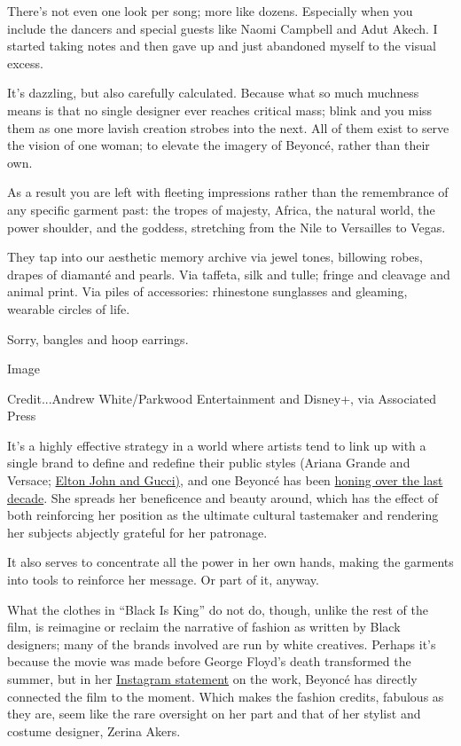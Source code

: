There's not even one look per song; more like dozens. Especially when
you include the dancers and special guests like Naomi Campbell and Adut
Akech. I started taking notes and then gave up and just abandoned myself
to the visual excess.

It's dazzling, but also carefully calculated. Because what so much
muchness means is that no single designer ever reaches critical mass;
blink and you miss them as one more lavish creation strobes into the
next. All of them exist to serve the vision of one woman; to elevate the
imagery of Beyoncé, rather than their own.

As a result you are left with fleeting impressions rather than the
remembrance of any specific garment past: the tropes of majesty, Africa,
the natural world, the power shoulder, and the goddess, stretching from
the Nile to Versailles to Vegas.

They tap into our aesthetic memory archive via jewel tones, billowing
robes, drapes of diamanté and pearls. Via taffeta, silk and tulle;
fringe and cleavage and animal print. Via piles of accessories:
rhinestone sunglasses and gleaming, wearable circles of life.

Sorry, bangles and hoop earrings.

Image

Credit...Andrew White/Parkwood Entertainment and Disney+, via Associated
Press

It's a highly effective strategy in a world where artists tend to link
up with a single brand to define and redefine their public styles
(Ariana Grande and Versace;
\href{https://www.nytimes3xbfgragh.onion/2018/09/07/style/elton-john-farewell-tour-wardrobe-gucci.html}{Elton
John and Gucci)}, and one Beyoncé has been
\href{https://www.nytimes3xbfgragh.onion/2016/04/26/fashion/fashion-beyonce-lemonade.html}{honing
over the last decade}. She spreads her beneficence and beauty around,
which has the effect of both reinforcing her position as the ultimate
cultural tastemaker and rendering her subjects abjectly grateful for her
patronage.

It also serves to concentrate all the power in her own hands, making the
garments into tools to reinforce her message. Or part of it, anyway.

What the clothes in ``Black Is King'' do not do, though, unlike the rest
of the film, is reimagine or reclaim the narrative of fashion as written
by Black designers; many of the brands involved are run by white
creatives. Perhaps it's because the movie was made before George Floyd's
death transformed the summer, but in her
\href{https://www.instagram.com/p/CCAMxfrHjAL/}{Instagram statement} on
the work, Beyoncé has directly connected the film to the moment. Which
makes the fashion credits, fabulous as they are, seem like the rare
oversight on her part and that of her stylist and costume designer,
Zerina Akers.


